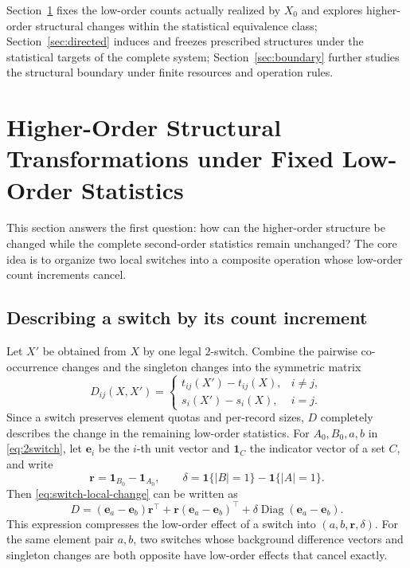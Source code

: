 \documentclass[11pt,a4paper]{article}
\numberwithin{equation}{section}
\theoremstyle{definition}
\numberwithin{algorithm}{section}
\begin{document}
Section~\ref{sec:variability} fixes the low-order counts actually realized by $X_0$ and
explores higher-order structural changes within the statistical equivalence class;
Section~\ref{sec:directed} induces and freezes prescribed structures under the statistical
targets of the complete system;
Section~\ref{sec:boundary} further studies the structural boundary under finite resources and
operation rules.

\section{Higher-Order Structural Transformations under Fixed Low-Order Statistics}\label{sec:variability}

This section answers the first question: how can the higher-order structure be changed while
the complete second-order statistics remain unchanged?
The core idea is to organize two local switches into a composite operation whose low-order
count increments cancel.

\subsection{Describing a switch by its count increment}\label{subsec:variation-signature}

Let $X'$ be obtained from $X$ by one legal $2$-switch.
Combine the pairwise co-occurrence changes and the singleton changes into the symmetric matrix
\begin{equation}
D_{ij}(X,X')=
\begin{cases}
t_{ij}(X')-t_{ij}(X),&i\neq j,\\
s_i(X')-s_i(X),&i=j.
\end{cases}
\label{eq:low-order-signature}
\end{equation}
Since a switch preserves element quotas and per-record sizes, $D$ completely describes the
change in the remaining low-order statistics.
For $A_0,B_0,a,b$ in \eqref{eq:2switch}, let $\boldsymbol e_i$ be the $i$-th unit vector and
$\boldsymbol 1_C$ the indicator vector of a set $C$, and write
\begin{equation}
\boldsymbol r=\boldsymbol1_{B_0}-\boldsymbol1_{A_0},\qquad
\delta=\mathbf1\{|B|=1\}-\mathbf1\{|A|=1\}.
\label{eq:trade-signature}
\end{equation}
Then \eqref{eq:switch-local-change} can be written as
\begin{equation}
D=(\boldsymbol e_a-\boldsymbol e_b)\boldsymbol r^\top+
\boldsymbol r(\boldsymbol e_a-\boldsymbol e_b)^\top+
\delta\operatorname{Diag}(\boldsymbol e_a-\boldsymbol e_b).
\label{eq:signature-matrix}
\end{equation}
This expression compresses the low-order effect of a switch into $(a,b,\boldsymbol r,\delta)$.
For the same element pair $a,b$, two switches whose background difference vectors and
singleton changes are both opposite have low-order effects that cancel exactly.
\end{document}
